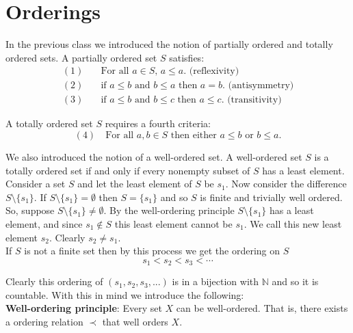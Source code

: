 \documentclass[12pt]{article}
\newlength\tindent
\renewcommand{\indent}{\hspace*{\tindent}}
\newcommand{\N}{\mathbb N}
\begin{document}
\section{Orderings}

In the previous class we introduced the notion of partially ordered and totally ordered sets. A partially ordered set $S$ satisfies:
\begin{align*}
	(1)& \quad \text{For all $a \in S$, $a \leq a$. (reflexivity) } \\
	(2)& \quad \text{if $a \leq b$ and $b \leq a$ then $a = b$. (antisymmetry)} \\
	(3)& \quad \text{if $a \leq b$ and $b \leq c$ then $a \leq c$. (transitivity)}
\end{align*}

A totally ordered set $S$ requires a fourth criteria:
\begin{equation*}
	(4) \quad \text{For all $a, b \in S$ then either $a \leq b$ or $b \leq a$.}
\end{equation*}

\indent We also introduced the notion of a well-ordered set. A well-ordered set $S$ is a totally ordered set if and only if every nonempty subset of $S$ has a least element. \\

\indent Consider a set $S$ and let the least element of $S$ be $s_1$. Now consider the difference $S \setminus \{s_1\}$. If $S \setminus \{s_1\} = \emptyset$ then $S = \{s_1\}$ and so $S$ is finite and trivially well ordered. So, suppose $S \setminus \{s_1\} \neq \emptyset$. By the well-ordering principle $S \setminus \{s_1\}$ has a least element, and since $s_1 \notin S$ this least element cannot be $s_1$. We call this new least element $s_2$. Clearly $s_2 \neq s_1$. \\

If $S$ is not a finite set then by this process we get the ordering on $S$ 
\begin{equation*}
	s_1 < s_2 < s_3 < \cdots
\end{equation*}

\indent Clearly this ordering of $(s_1, s_2, s_3, ...)$ is in a bijection with $\N$ and so it is countable. With this in mind we introduce the following: \\


{\bf Well-ordering principle}: Every set $X$ can be well-ordered. That is, there exists a ordering relation $\prec$ that well orders $X$. \\
\end{document}
